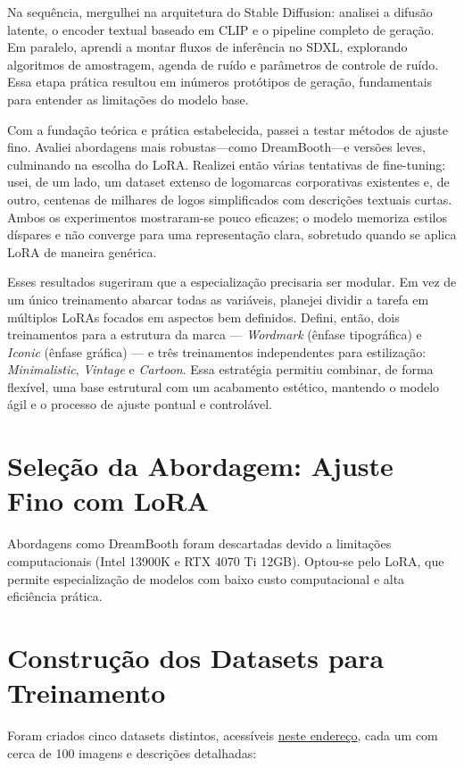 \documentclass[12pt, %
openright, 
oneside, %
a4paper,    %
brazil]{facom-ufu-abntex2}
\begin{document}
Na sequência, mergulhei na arquitetura do Stable Diffusion: analisei a difusão latente, o encoder textual baseado em CLIP e o pipeline completo de geração. Em paralelo, aprendi a montar fluxos de inferência no SDXL, explorando algoritmos de amostragem, agenda de ruído e parâmetros de controle de ruído. Essa etapa prática resultou em inúmeros protótipos de geração, fundamentais para entender as limitações do modelo base.

Com a fundação teórica e prática estabelecida, passei a testar métodos de ajuste fino. Avaliei abordagens mais robustas—como DreamBooth—e versões leves, culminando na escolha do LoRA. Realizei então várias tentativas de fine-tuning: usei, de um lado, um dataset extenso de logomarcas corporativas existentes e, de outro, centenas de milhares de logos simplificados com descrições textuais curtas. Ambos os experimentos mostraram-se pouco eficazes; o modelo memoriza estilos díspares e não converge para uma representação clara, sobretudo quando se aplica LoRA de maneira genérica.

Esses resultados sugeriram que a especialização precisaria ser modular. Em vez de um único treinamento abarcar todas as variáveis, planejei dividir a tarefa em múltiplos LoRAs focados em aspectos bem definidos. Defini, então, dois treinamentos para a estrutura da marca — \emph{Wordmark} (ênfase tipográfica) e \emph{Iconic} (ênfase gráfica) — e três treinamentos independentes para estilização: \emph{Minimalistic}, \emph{Vintage} e \emph{Cartoon}. Essa estratégia permitiu combinar, de forma flexível, uma base estrutural com um acabamento estético, mantendo o modelo ágil e o processo de ajuste pontual e controlável.

\section{Seleção da Abordagem: Ajuste Fino com LoRA}

Abordagens como DreamBooth foram descartadas devido a limitações computacionais (Intel 13900K e RTX 4070 Ti 12GB). Optou-se pelo LoRA, que permite especialização de modelos com baixo custo computacional e alta eficiência prática.

\section{Construção dos Datasets para Treinamento}

Foram criados cinco datasets distintos, acessíveis \href{https://github.com/tornellihenrique/tcc-stable-diffusion-logos/tree/main/lora-datasets}{neste endereço}, cada um com cerca de 100 imagens e descrições detalhadas:
\end{document}
